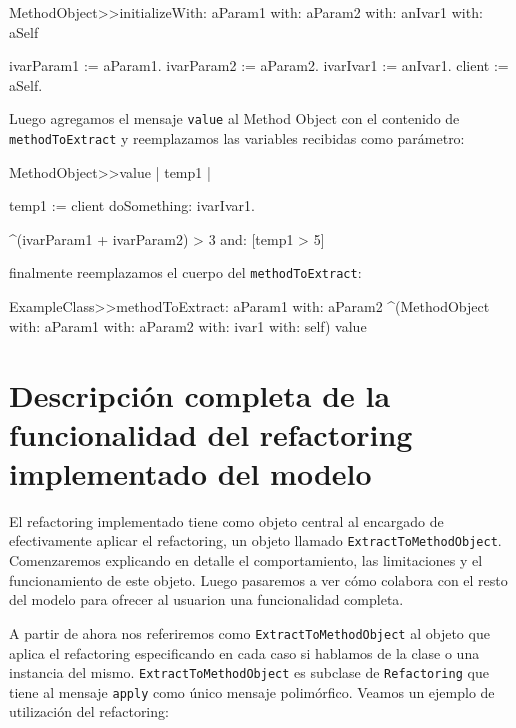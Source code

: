 \begin{code}
  MethodObject>>initializeWith: aParam1 with: aParam2 with: anIvar1 with: aSelf

  ivarParam1 := aParam1.
  ivarParam2 := aParam2.
  ivarIvar1 := anIvar1.
  client := aSelf.
\end{code}

Luego agregamos el mensaje \lstinline{value} al Method Object con el contenido
de \lstinline{methodToExtract} y reemplazamos las variables recibidas como
parámetro:

\begin{code}
MethodObject>>value | temp1 |

    temp1 := client doSomething: ivarIvar1.

    ^(ivarParam1 + ivarParam2) > 3 and: [temp1 > 5]
\end{code}

finalmente reemplazamos el cuerpo del \lstinline{methodToExtract}:

\begin{code}
ExampleClass>>methodToExtract: aParam1 with: aParam2 ^(MethodObject with:
aParam1 with: aParam2 with: ivar1 with: self) value
\end{code}



\section{Descripción completa de la funcionalidad del refactoring implementado del modelo}


El refactoring implementado tiene como objeto central al encargado de
efectivamente aplicar el refactoring, un objeto llamado
\lstinline{ExtractToMethodObject}. Comenzaremos explicando en detalle el
comportamiento, las limitaciones y el funcionamiento de este objeto. Luego
pasaremos a ver cómo colabora con el resto del modelo para ofrecer al usuarion
una funcionalidad completa.

A partir de ahora nos referiremos como \lstinline{ExtractToMethodObject} al
objeto que aplica el refactoring especificando en cada caso si hablamos de la
clase o una instancia del mismo. \lstinline{ExtractToMethodObject} es subclase
de \lstinline{Refactoring} que tiene al mensaje \lstinline{apply} como único
mensaje polimórfico.
Veamos un ejemplo de utilización del refactoring:

